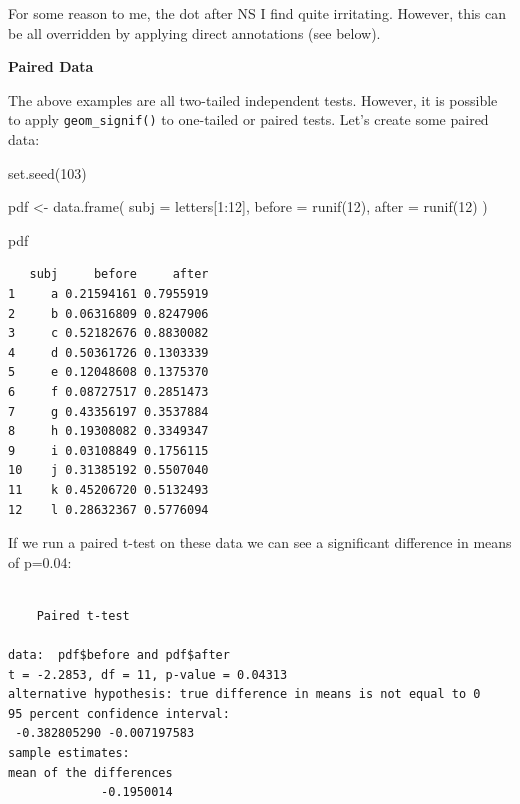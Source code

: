 \documentclass[
  letterpaper,
  DIV=11,
  numbers=noendperiod]{scrreprt}
\newenvironment{Shaded}{\begin{snugshade}}{\end{snugshade}}
\newcommand{\AttributeTok}[1]{\textcolor[rgb]{0.40,0.45,0.13}{#1}}
\newcommand{\DecValTok}[1]{\textcolor[rgb]{0.68,0.00,0.00}{#1}}
\newcommand{\FunctionTok}[1]{\textcolor[rgb]{0.28,0.35,0.67}{#1}}
\newcommand{\NormalTok}[1]{\textcolor[rgb]{0.00,0.23,0.31}{#1}}
\newcommand{\OtherTok}[1]{\textcolor[rgb]{0.00,0.23,0.31}{#1}}
\newcommand{\SpecialCharTok}[1]{\textcolor[rgb]{0.37,0.37,0.37}{#1}}
\begin{document}
For some reason to me, the dot after NS I find quite irritating.
However, this can be all overridden by applying direct annotations (see
below).

\textbf{Paired Data}

The above examples are all two-tailed independent tests. However, it is
possible to apply \texttt{geom\_signif()} to one-tailed or paired tests.
Let's create some paired data:

\begin{Shaded}
\begin{Highlighting}[]
\FunctionTok{set.seed}\NormalTok{(}\DecValTok{103}\NormalTok{)}

\NormalTok{pdf }\OtherTok{\textless{}{-}} \FunctionTok{data.frame}\NormalTok{(}
  \AttributeTok{subj =}\NormalTok{ letters[}\DecValTok{1}\SpecialCharTok{:}\DecValTok{12}\NormalTok{],}
  \AttributeTok{before =} \FunctionTok{runif}\NormalTok{(}\DecValTok{12}\NormalTok{),}
  \AttributeTok{after =} \FunctionTok{runif}\NormalTok{(}\DecValTok{12}\NormalTok{)}
\NormalTok{)}

\NormalTok{pdf}
\end{Highlighting}
\end{Shaded}

\begin{verbatim}
   subj     before     after
1     a 0.21594161 0.7955919
2     b 0.06316809 0.8247906
3     c 0.52182676 0.8830082
4     d 0.50361726 0.1303339
5     e 0.12048608 0.1375370
6     f 0.08727517 0.2851473
7     g 0.43356197 0.3537884
8     h 0.19308082 0.3349347
9     i 0.03108849 0.1756115
10    j 0.31385192 0.5507040
11    k 0.45206720 0.5132493
12    l 0.28632367 0.5776094
\end{verbatim}

If we run a paired t-test on these data we can see a significant
difference in means of p=0.04:

\begin{Shaded}
\end{Shaded}

\begin{verbatim}

    Paired t-test

data:  pdf$before and pdf$after
t = -2.2853, df = 11, p-value = 0.04313
alternative hypothesis: true difference in means is not equal to 0
95 percent confidence interval:
 -0.382805290 -0.007197583
sample estimates:
mean of the differences 
             -0.1950014 
\end{verbatim}
\end{document}
